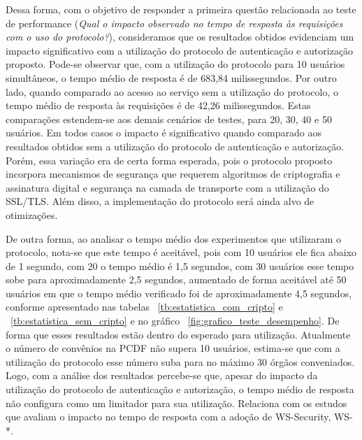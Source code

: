Dessa forma, com o objetivo de responder a primeira questão relacionada ao teste de performance 
(\emph{Qual o impacto observado no tempo de resposta às requisições com o uso do protocolo?}), 
consideramos que os resultados obtidos evidenciam um impacto significativo com a utilização do protocolo de autenticação e autorização proposto. 
Pode-se observar que, com a utilização do protocolo para 10 usuários simultâneos, o tempo médio de resposta é de 683,84 milissegundos. 
Por outro lado, quando comparado ao acesso ao serviço sem a utilização do protocolo, o tempo médio de resposta às requisições é de 42,26 milissegundos. 
Estas comparações estendem-se aos demais cen\'{a}rios de testes, para 20, 30, 40 e 50 usuários. Em todos casos o impacto é significativo quando comparado 
aos resultados obtidos sem a utilização do protocolo de autenticação e autorização. Porém, essa variação era de certa forma esperada, pois o protocolo proposto 
incorpora mecanismos de segurança que requerem algoritmos de criptografia e assinatura digital e segurança na camada de transporte com a utilização do SSL/TLS. 
Além disso, a implementação do protocolo será ainda alvo de otimizações.

De outra forma, ao analisar o tempo médio dos experimentos que utilizaram o protocolo, nota-se que este tempo é aceitável, pois com 10 usuários ele fica abaixo de 1 segundo, com 20 o tempo médio é 1,5 segundos, com 30 usuários esse tempo sobe para aproximadamente 2,5 segundos, aumentado de forma aceitável até 50 usuários em que o tempo médio verificado foi de aproximadamente 4,5 segundos, conforme apresentado nas tabelas ~\ref{tb:estatistica_com_cripto} e ~\ref{tb:estatistica_sem_cripto} e no gráfico ~\ref{fig:grafico_teste_desempenho}. De forma que esses resultados estão dentro do esperado para utilização. Atualmente o número de convênios na PCDF não supera 10 usuários, estima-se que com a utilização do protocolo esse número suba para no máximo 30 órgãos conveniados. Logo, com a análise dos resultados percebe-se que, apesar do impacto da utilização do protocolo de autenticação e autorização, o tempo m\'{e}dio de resposta não configura como um limitador para sua utilização. {\color{red}Relaciona com os estudos que avaliam o impacto no tempo de resposta com a 
ado\c c\~{a}o de WS-Security, WS-*.}


